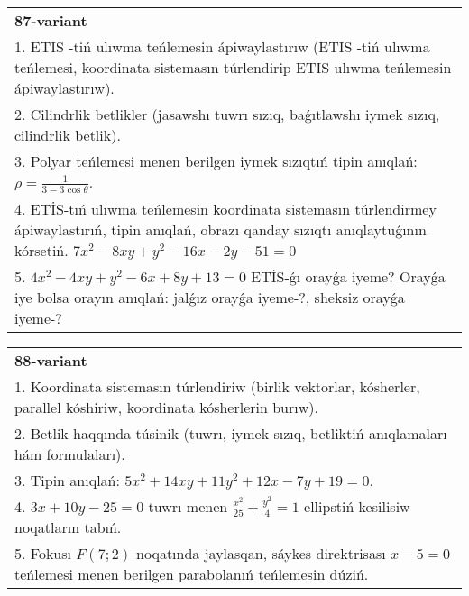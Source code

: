 \documentclass{article}
\begin{document}
\begin{tabular}{m{17cm}}
\textbf{87-variant}\\
1. ETIS -tiń ulıwma teńlemesin ápiwaylastırıw (ETIS -tiń ulıwma teńlemesi, koordinata sistemasın túrlendirip ETIS ulıwma teńlemesin ápiwaylastırıw).\\

2. Cilindrlik betlikler (jasawshı tuwrı sızıq, baǵıtlawshı iymek sızıq, cilindrlik betlik).\\

3. Polyar teńlemesi menen berilgen iymek sızıqtıń tipin anıqlań: $\rho=\frac{1}{3-3\cos\theta}$.\\

4. ETİS-tıń ulıwma teńlemesin koordinata sistemasın túrlendirmey ápiwaylastırıń, tipin anıqlań, obrazı qanday sızıqtı anıqlaytuǵının kórsetiń. $7x^{2} - 8xy + y^{2} - 16x - 2y - 51 = 0$  \\

5. $4x^{2} - 4xy + y^{2} - 6x + 8y + 13 = 0$ ETİS-ǵı orayǵa iyeme? Orayǵa iye bolsa orayın anıqlań: jalǵız orayǵa iyeme-?, sheksiz orayǵa iyeme-?  
\end{tabular}
\vspace{1cm}


\begin{tabular}{m{17cm}}
\textbf{88-variant}\\
1. Koordinata sistemasın túrlendiriw (birlik vektorlar, kósherler, parallel kóshiriw, koordinata kósherlerin burıw).\\

2. Betlik haqqında túsinik (tuwrı, iymek sızıq, betliktiń anıqlamaları hám formulaları).\\

3. Tipin anıqlań: $5 x^{2}+14 xy+11 y^{2}+12 x-7 y+19=0$.\\

4. $3x + 10y - 25 = 0$ tuwrı menen $\frac{x^{2}}{25} + \frac{y^{2}}{4} = 1$ ellipstiń kesilisiw noqatların tabıń.\\

5. Fokusı $F(7;2)$ noqatında jaylasqan, sáykes direktrisası $x - 5 = 0$ teńlemesi menen berilgen parabolanıń teńlemesin dúziń.  
\end{tabular}
\vspace{1cm}
\end{document}
